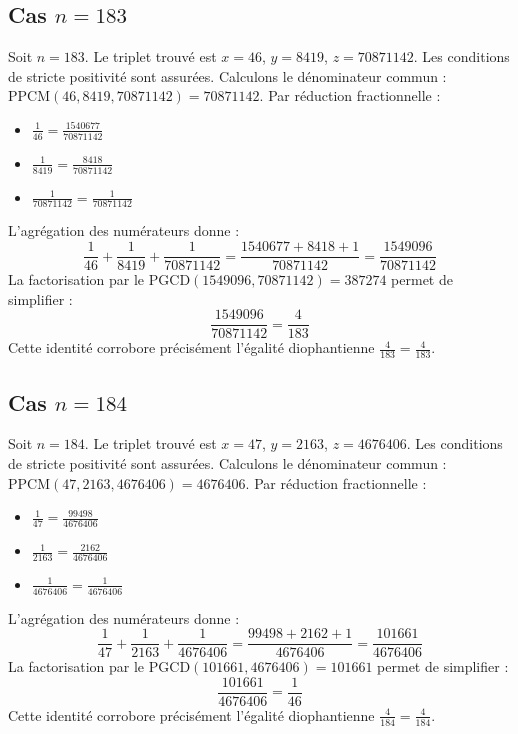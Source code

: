 \documentclass[11pt,a4paper]{article}
\begin{document}
\subsection{Cas $n = 183$}
Soit $n = 183$. Le triplet trouvé est $x = 46$, $y = 8419$, $z = 70871142$.
Les conditions de stricte positivité sont assurées.
Calculons le dénominateur commun : $\text{PPCM}(46, 8419, 70871142) = 70871142$.
Par réduction fractionnelle :
\begin{itemize}
    \item $\frac{1}{46} = \frac{1540677}{70871142}$
    \item $\frac{1}{8419} = \frac{8418}{70871142}$
    \item $\frac{1}{70871142} = \frac{1}{70871142}$
\end{itemize}
L'agrégation des numérateurs donne :
$$ \frac{1}{46} + \frac{1}{8419} + \frac{1}{70871142} = \frac{1540677 + 8418 + 1}{70871142} = \frac{1549096}{70871142} $$
La factorisation par le $\text{PGCD}(1549096, 70871142) = 387274$ permet de simplifier :
$$ \frac{1549096}{70871142} = \frac{4}{183} $$
Cette identité corrobore précisément l'égalité diophantienne $\frac{4}{183} = \frac{4}{183}$.

\subsection{Cas $n = 184$}
Soit $n = 184$. Le triplet trouvé est $x = 47$, $y = 2163$, $z = 4676406$.
Les conditions de stricte positivité sont assurées.
Calculons le dénominateur commun : $\text{PPCM}(47, 2163, 4676406) = 4676406$.
Par réduction fractionnelle :
\begin{itemize}
    \item $\frac{1}{47} = \frac{99498}{4676406}$
    \item $\frac{1}{2163} = \frac{2162}{4676406}$
    \item $\frac{1}{4676406} = \frac{1}{4676406}$
\end{itemize}
L'agrégation des numérateurs donne :
$$ \frac{1}{47} + \frac{1}{2163} + \frac{1}{4676406} = \frac{99498 + 2162 + 1}{4676406} = \frac{101661}{4676406} $$
La factorisation par le $\text{PGCD}(101661, 4676406) = 101661$ permet de simplifier :
$$ \frac{101661}{4676406} = \frac{1}{46} $$
Cette identité corrobore précisément l'égalité diophantienne $\frac{4}{184} = \frac{4}{184}$.
\end{document}
